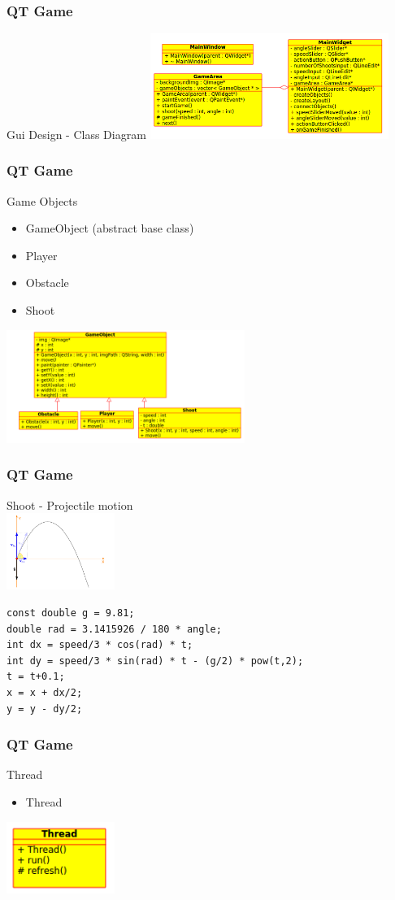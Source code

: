 \begin{frame}[fragile]
\frametitle{QT Game}
Gui Design - Class Diagram
\includegraphics[width=220pt]{img/qtgame_cdgui.png}
\end{frame}

\begin{frame}[fragile]
\frametitle{QT Game}
Game Objects
\begin{itemize}
\item GameObject (abstract base class)
\item Player
\item Obstacle
\item Shoot
\end{itemize}
\includegraphics[width=220pt]{img/qtgame_cdgo.png}
\end{frame}

\begin{frame}[fragile]
\frametitle{QT Game}
Shoot - Projectile motion\\
\includegraphics[width=100pt]{img/pro_motion.png}

{\small
\begin{lstlisting}
const double g = 9.81;
double rad = 3.1415926 / 180 * angle;
int dx = speed/3 * cos(rad) * t;
int dy = speed/3 * sin(rad) * t - (g/2) * pow(t,2);
t = t+0.1;
x = x + dx/2;
y = y - dy/2;
\end{lstlisting}
}
\end{frame}

\begin{frame}[fragile]
\frametitle{QT Game}
Thread
\begin{itemize}
\item Thread
\end{itemize}
\includegraphics[width=100pt]{img/qtgame_cdthread.png}
\end{frame}

